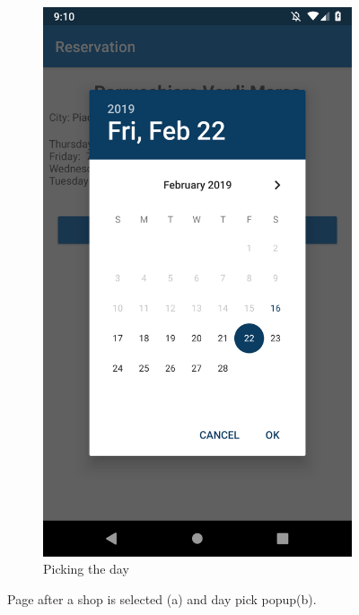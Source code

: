 \begin{figure}[h]
\begin{subfigure}{.5\textwidth}
  \includegraphics[height=.4\textheight, keepaspectratio=true]{Img/Screens/Customer_Search_Selected_Day}
  \caption{Picking the day}
\end{subfigure}
\caption{Page after a shop is selected (a) and day pick popup(b).}
\end{figure}

